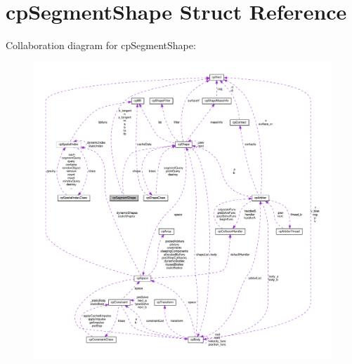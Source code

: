 \hypertarget{structcpSegmentShape}{}\section{cp\+Segment\+Shape Struct Reference}
\label{structcpSegmentShape}


Collaboration diagram for cp\+Segment\+Shape\+:
\nopagebreak
\begin{figure}[H]
\begin{center}
\leavevmode
\includegraphics[width=350pt]{structcpSegmentShape__coll__graph}
\end{center}
\end{figure}
